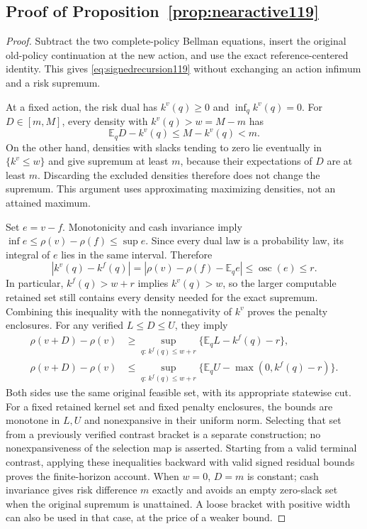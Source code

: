 \subsection{Proof of Proposition~\ref{prop:nearactive119}}
\begin{proof}
Subtract the two complete-policy Bellman equations, insert the original
old-policy continuation at the new action, and use the exact
reference-centered identity.  This gives
\eqref{eq:signedrecursion119} without exchanging an action infimum
and a risk supremum.

At a fixed action, the risk dual has $k^v(q)\ge0$ and
$\inf_qk^v(q)=0$.  For $D\in[m,M]$, every density with
$k^v(q)>w=M-m$ has
\[
 \mathbb E_qD-k^v(q)\le M-k^v(q)<m.
\]
On the other hand, densities with slacks tending to zero lie eventually
in $\{k^v\le w\}$ and give supremum at least $m$, because their
expectations of $D$ are at least $m$.  Discarding the excluded
densities therefore does not change the supremum.  This argument
uses approximating maximizing densities, not an attained maximum.

Set $e=v-f$.  Monotonicity and cash invariance imply
$\inf e\le\rho(v)-\rho(f)\le\sup e$.
Since every dual law is a probability law, its integral of $e$ lies
in the same interval.  Therefore
\[
 |k^v(q)-k^f(q)|
 =|\rho(v)-\rho(f)-\mathbb E_q e|
 \le\operatorname{osc}(e)\le r.
\]
In particular, $k^f(q)>w+r$ implies $k^v(q)>w$, so the
larger computable retained set still contains every density needed
for the exact supremum.  Combining this inequality with the
nonnegativity of $k^v$ proves the penalty enclosures.  For any
verified $L\le D\le U$, they imply
\[
\begin{aligned}
 \rho(v+D)-\rho(v)&\ge\sup_{q:\,k^f(q)\le w+r}
    \{\mathbb E_qL-k^f(q)-r\},\\
 \rho(v+D)-\rho(v)&\le\sup_{q:\,k^f(q)\le w+r}
    \{\mathbb E_qU-\max(0,k^f(q)-r)\}.
\end{aligned}
\]
Both sides use the same original feasible set, with its appropriate
statewise cut.  For a fixed retained kernel set and fixed penalty
enclosures, the bounds are monotone in $L,U$ and nonexpansive in
their uniform norm.  Selecting that set from a previously verified
contrast bracket is a separate construction; no nonexpansiveness of
the selection map is asserted.  Starting from a valid terminal
contrast, applying these inequalities backward with valid signed
residual bounds proves the finite-horizon account.
When $w=0$, $D=m$ is constant; cash invariance gives risk
difference $m$ exactly and avoids an empty zero-slack set when the
original supremum is unattained.  A loose bracket with positive
width can also be used in that case, at the price of a weaker bound.
\end{proof}
